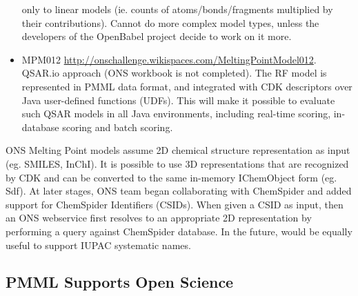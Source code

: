 \documentclass[12pt,letterpaper]{article}
\begin{document}
\begin{itemize}
  only to linear models (ie. counts of atoms/bonds/fragments multiplied by their
  contributions). Cannot do more complex model types, unless the developers
  of the OpenBabel project decide to work on it more.
  \item MPM012 \url{http://onschallenge.wikispaces.com/MeltingPointModel012}.
  QSAR.io approach (ONS workbook is not completed). The RF model is represented
  in PMML data format, and integrated with CDK descriptors over Java user-defined
  functions (UDFs). This will make it possible to evaluate such QSAR models
  in all Java environments, including real-time scoring, in-database scoring
  and batch scoring.
\end{itemize}

ONS Melting Point models assume 2D chemical structure representation as input
(eg. SMILES, InChI). It is possible to use 3D representations that are recognized
by CDK and can be converted to the same in-memory IChemObject form (eg. Sdf).
At later stages, ONS team began collaborating with ChemSpider and added support
for ChemSpider Identifiers (CSIDs). When given a CSID as input, then an ONS
webservice first resolves to an appropriate 2D representation by performing a
query against ChemSpider database. In the future, would be equally useful to 
support IUPAC systematic names. 

\subsection{PMML Supports Open Science}
\label{sec:pmml-supports-open}




\end{document}
